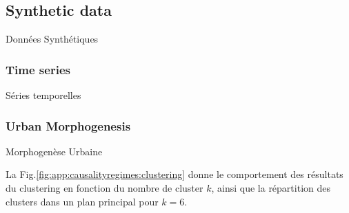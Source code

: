 







\subsection{Synthetic data}{Données Synthétiques}


\subsubsection{Time series}{Séries temporelles}





\subsubsection{Urban Morphogenesis}{Morphogenèse Urbaine}


La Fig.\ref{fig:app:causalityregimes:clustering} donne le comportement des résultats du clustering en fonction du nombre de cluster $k$, ainsi que la répartition des clusters dans un plan principal pour $k=6$.

